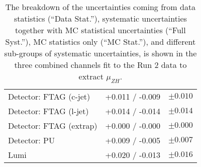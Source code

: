 \begin{table}[h]
\begin{tabular}{|l|c|c|}
Detector: FTAG (c-jet)   & +0.011 / -0.009 & $ \pm 0.010 $ \\
Detector: FTAG (l-jet)   & +0.014 / -0.014 & $ \pm 0.014 $ \\
Detector: FTAG (extrap)  & +0.000 / -0.000 & $ \pm 0.000 $ \\
Detector: PU             & +0.009 / -0.005 & $ \pm 0.007 $ \\
Lumi                     & +0.020 / -0.013 & $ \pm 0.016 $ \\
\hline\hline
\end{tabular}
\caption{The breakdown of the uncertainties coming from data statistics (``Data Stat.''), systematic uncertainties together with MC statistical uncertainties (``Full Syst.''), MC statistics only (``MC Stat.''), and different sub-groups of systematic uncertainties, is shown in the three combined channels fit to the Run 2 data to extract $\mu_{ZH}$.}
 \label{tab:breakdown_012L_MVAZH}
\end{table}